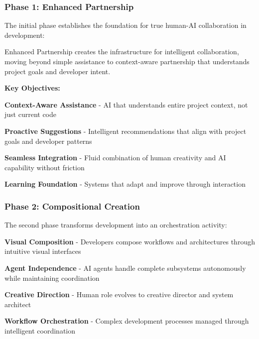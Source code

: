 \subsubsection{Phase 1: Enhanced Partnership}

The initial phase establishes the foundation for true human-AI collaboration in development:

\begin{successbox}
Enhanced Partnership creates the infrastructure for intelligent collaboration, moving beyond simple assistance to context-aware partnership that understands project goals and developer intent.
\end{successbox}

\textbf{Key Objectives:}

\begin{compactlist}
    \item \textbf{Context-Aware Assistance} - AI that understands entire project context, not just current code
    \item \textbf{Proactive Suggestions} - Intelligent recommendations that align with project goals and developer patterns
    \item \textbf{Seamless Integration} - Fluid combination of human creativity and AI capability without friction
    \item \textbf{Learning Foundation} - Systems that adapt and improve through interaction
\end{compactlist}

\subsubsection{Phase 2: Compositional Creation}

The second phase transforms development into an orchestration activity:

\begin{expandedlist}
    \item \textbf{Visual Composition} - Developers compose workflows and architectures through intuitive visual interfaces
    
    \item \textbf{Agent Independence} - AI agents handle complete subsystems autonomously while maintaining coordination
    
    \item \textbf{Creative Direction} - Human role evolves to creative director and system architect
    
    \item \textbf{Workflow Orchestration} - Complex development processes managed through intelligent coordination
\end{expandedlist}

